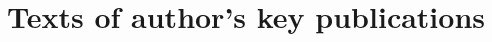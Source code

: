\chapter{Texts of author’s key publications}
\label{app:publications}
\setcounter{totalappendix}{\value{chapter}} 

